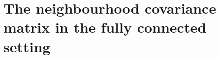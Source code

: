\documentclass{article}
\begin{document}

\section{The neighbourhood covariance matrix in the fully connected setting\label{appendix.dd}}
\end{document}
